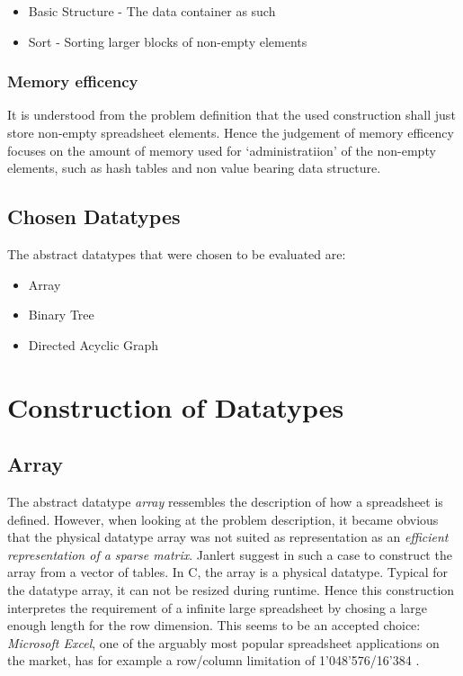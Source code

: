 \documentclass[a4paper,11pt,twoside]{article}
\begin{document}
\begin{itemize}
\item Basic Structure - The data container as such
\item Sort - Sorting larger blocks of non-empty elements
\end{itemize}

\subsubsection{Memory efficency}
It is understood from the problem definition that the used
construction shall just store non-empty spreadsheet elements. Hence
the judgement of memory efficency focuses on the amount of
memory used for `administratiion' of the non-empty elements, such as
hash tables and non value bearing data structure. 


\subsection{Chosen Datatypes}
The abstract datatypes that were chosen to be evaluated are:
\begin{itemize}
\item Array
\item Binary Tree
\item Directed Acyclic Graph
\end{itemize}



\section{Construction of Datatypes}
\subsection{Array}
The abstract datatype \emph{array} ressembles the description of 
how a spreadsheet is defined. However, when looking at the problem 
description, it became obvious that the physical datatype array was 
not suited as representation as an \emph{efficient representation of a
 sparse matrix}. Janlert \cite[pp 101-103]{janlert2000} suggest in
such a case to construct the array from a vector of tables. In C, the
array is a physical datatype. Typical for the datatype array, it can
not be resized during runtime. Hence this construction interpretes the
requirement of a infinite large spreadsheet by chosing a large enough
length for the row dimension. This seems to be an accepted choice:
\textit{Microsoft Excel}, one of the arguably most popular spreadsheet
applications on the market, has for example a row/column limitation of
1'048'576/16'384 \cite{excel_limit}.
\end{document}
